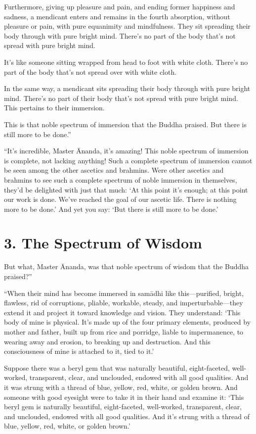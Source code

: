 \documentclass[12pt,openany]{book}%
\begin{document}
Furthermore, giving up pleasure and pain, and ending former happiness and sadness, a mendicant enters and remains in the fourth absorption, without pleasure or pain, with pure equanimity and mindfulness. They sit spreading their body through with pure bright mind. There’s no part of the body that’s not spread with pure bright mind. 

It’s like someone sitting wrapped from head to foot with white cloth. There’s no part of the body that’s not spread over with white cloth. 

In the same way, a mendicant sits spreading their body through with pure bright mind. There's no part of their body that's not spread with pure bright mind. This pertains to their immersion. 

This is that noble spectrum of immersion that the Buddha praised. But there is still more to be done.” 

“It’s incredible, Master Ānanda, it’s amazing! This noble spectrum of immersion is complete, not lacking anything! Such a complete spectrum of immersion cannot be seen among the other ascetics and brahmins. Were other ascetics and brahmins to see such a complete spectrum of noble immersion in themselves, they’d be delighted with just that much: ‘At this point it’s enough; at this point our work is done. We’ve reached the goal of our ascetic life. There is nothing more to be done.’ And yet you say: ‘But there is still more to be done.’ 

\section*{3. The Spectrum of Wisdom }

But what, Master Ānanda, was that noble spectrum of wisdom that the Buddha praised?” 

“When their mind has become immersed in \textsanskrit{samādhi} like this—purified, bright, flawless, rid of corruptions, pliable, workable, steady, and imperturbable—they extend it and project it toward knowledge and vision. They understand: ‘This body of mine is physical. It’s made up of the four primary elements, produced by mother and father, built up from rice and porridge, liable to impermanence, to wearing away and erosion, to breaking up and destruction. And this consciousness of mine is attached to it, tied to it.’ 

Suppose there was a beryl gem that was naturally beautiful, eight-faceted, well-worked, transparent, clear, and unclouded, endowed with all good qualities. And it was strung with a thread of blue, yellow, red, white, or golden brown. And someone with good eyesight were to take it in their hand and examine it: ‘This beryl gem is naturally beautiful, eight-faceted, well-worked, transparent, clear, and unclouded, endowed with all good qualities. And it’s strung with a thread of blue, yellow, red, white, or golden brown.’ 
\end{document}
